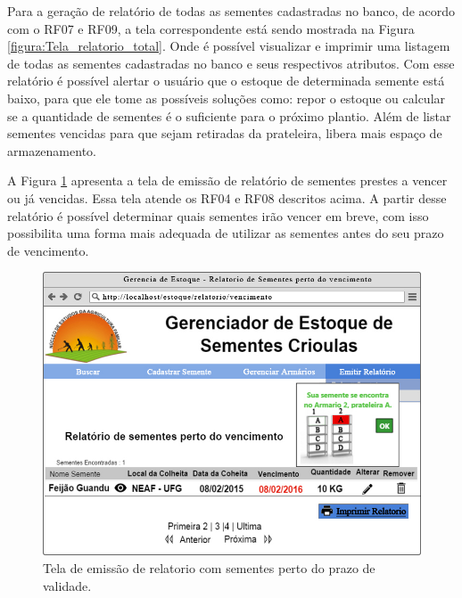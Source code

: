 \documentclass[12pt,a4paper]{article}
\begin{document}
Para a geração de relatório de todas as sementes cadastradas no banco, de acordo com o RF07 e RF09, a tela correspondente está sendo mostrada na Figura \ref{figura:Tela_relatorio_total}. Onde é possível visualizar e imprimir uma listagem de todas as sementes cadastradas no banco e seus respectivos atributos. Com esse relatório é possível alertar o usuário que o estoque de determinada semente está baixo, para que ele tome as possíveis soluções como: repor o estoque ou calcular se a quantidade  de sementes é o suficiente para o próximo plantio. Além de listar sementes vencidas para que sejam retiradas da prateleira, libera mais espaço de armazenamento. 

A Figura \ref{figura:Tela_relatorio_vencimento} apresenta a tela de emissão de relatório de sementes prestes a vencer ou já vencidas. Essa tela atende os RF04 e RF08 descritos acima. A partir desse relatório é possível determinar quais sementes irão vencer em breve, com isso possibilita uma forma mais adequada de utilizar as sementes antes do  seu prazo de vencimento. 

\begin{figure}[H]
\centering %
\includegraphics[width=14cm]{Figuras/relatorio_vencimento.jpg} %
\caption{Tela de emissão de relatorio com sementes perto do prazo de validade.}
\label{figura:Tela_relatorio_vencimento}
\end{figure}
\end{document}
